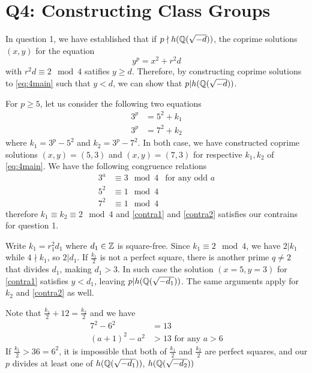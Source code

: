 \section{Q4: Constructing Class Groups}

In question 1, we have established that if $p \nmid h(\mathbb{Q}(\sqrt{-d}))$, the coprime solutions $(x, y)$ for the equation 
\begin{equation}\label{eq:4main}
	y^p = x^2 + r^2 d
\end{equation}
with $r^2 d \equiv 2 \mod 4$ satifies $y \geq d$.
Therefore, by constructing coprime solutions to \eqref{eq:4main} such that $y < d$, we can show that $p | h(\mathbb{Q}(\sqrt{-d}))$.

For $p \geq 5$, let us consider the following two equations 
\begin{align}
	3^p &= 5^2 + k_1 \label{contra1}\\
	3^p &= 7^2 + k_2 \label{contra2}
\end{align}
where $k_1 = 3^p - 5^2$ and $k_2 = 3^p - 7^2$.
In both case, we have constructed coprime solutions $(x, y) = (5, 3)$ and $(x, y) = (7, 3)$ for respective $k_1, k_2$ of \autoref{eq:4main}.
We have the following congruence relations
\begin{align}
	3^a &\equiv 3 \mod 4   &\text{for any odd }a\\
	5^2 &\equiv 1 \mod 4 &\\
	7^2 &\equiv 1 \mod 4 &
\end{align}
therefore $k_1 \equiv k_2 \equiv 2 \mod 4$ and \eqref{contra1} and \eqref{contra2} satisfies our contrains for question 1. 

Write $k_1 = r_1^2 d_1$ where $d_1 \in \mathbb{Z}$ is square-free.
Since $ k_1 \equiv 2 \mod 4$, we have $2 | k_1$ while $4 \nmid k_1$, so $2 |d_1$. 
If $\frac{k_1}{2}$ is not a perfect square, there is another prime $q \neq 2$ that divides $d_1$, making $d_1 > 3$.
In such case the solution $(x = 5, y = 3)$ for \eqref{contra1} satisfies $y < d_1$, leaving $p | h(\mathbb{Q}(\sqrt{-d_1}))$.
The same arguments apply for $k_2$ and \eqref{contra2} as well.

Note that $\frac{k_1}{2} + 12 = \frac{k_2}{2}$ and we have 
\begin{align}
	7^2 - 6^2 &= 13 \\ 
	(a+1)^2 - a^2 &> 13 \text{ for any } a > 6
\end{align}
If $\frac{k_1}{2} > 36 = 6^2$, it is impossible that both of $\frac{k_1}{2}$ and $\frac{k_2}{2}$ are perfect squares, and our $p$ divides at least one of $h(\mathbb{Q}(\sqrt{-d_1}))$, $h(\mathbb{Q}(\sqrt{-d_2}))$

